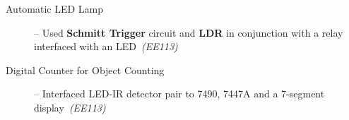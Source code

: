 \documentclass[10pt,a4paper,sans]{moderncv}        %
\newcommand{\rhsmalle}[1]{\hfill{\footnotesize{\textsl{(#1)}}}\\[-12pt]}
\begin{document}
\begin{description}
	\item[Automatic LED Lamp] -- Used \textbf{Schmitt Trigger} circuit and \textbf{LDR} in conjunction with a relay interfaced with an LED\ \rhsmalle{EE113}
	\item[Digital Counter for Object Counting] -- Interfaced LED-IR detector pair to 7490, 7447A and a 7-segment display\ \rhsmalle{EE113}%
\end{description}
\end{document}
